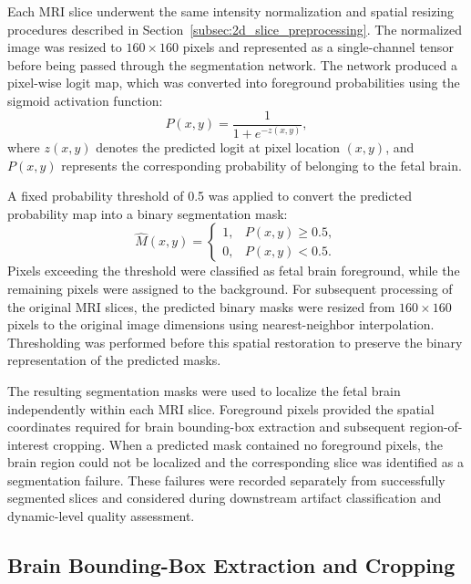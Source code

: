 Each MRI slice underwent the same intensity normalization and spatial resizing procedures described in Section~\ref{subsec:2d_slice_preprocessing}. The normalized image was resized to $160 \times 160$ pixels and represented as a single-channel tensor before being passed through the segmentation network. The network produced a pixel-wise logit map, which was converted into foreground probabilities using the sigmoid activation function:
\begin{equation}
P(x,y)=\frac{1}{1+e^{-z(x,y)}},
\end{equation}
where $z(x,y)$ denotes the predicted logit at pixel location $(x,y)$, and $P(x,y)$ represents the corresponding probability of belonging to the fetal brain.

A fixed probability threshold of 0.5 was applied to convert the predicted probability map into a binary segmentation mask:
\begin{equation}
\hat{M}(x,y)=
\begin{cases}
1, & P(x,y)\geq 0.5,\\
0, & P(x,y)<0.5.
\end{cases}
\end{equation}
Pixels exceeding the threshold were classified as fetal brain foreground, while the remaining pixels were assigned to the background. For subsequent processing of the original MRI slices, the predicted binary masks were resized from $160 \times 160$ pixels to the original image dimensions using nearest-neighbor interpolation. Thresholding was performed before this spatial restoration to preserve the binary representation of the predicted masks.

The resulting segmentation masks were used to localize the fetal brain independently within each MRI slice. Foreground pixels provided the spatial coordinates required for brain bounding-box extraction and subsequent region-of-interest cropping. When a predicted mask contained no foreground pixels, the brain region could not be localized and the corresponding slice was identified as a segmentation failure. These failures were recorded separately from successfully segmented slices and considered during downstream artifact classification and dynamic-level quality assessment.

\subsection{Brain Bounding-Box Extraction and Cropping}
\label{subsec:2d_roi_crop}

